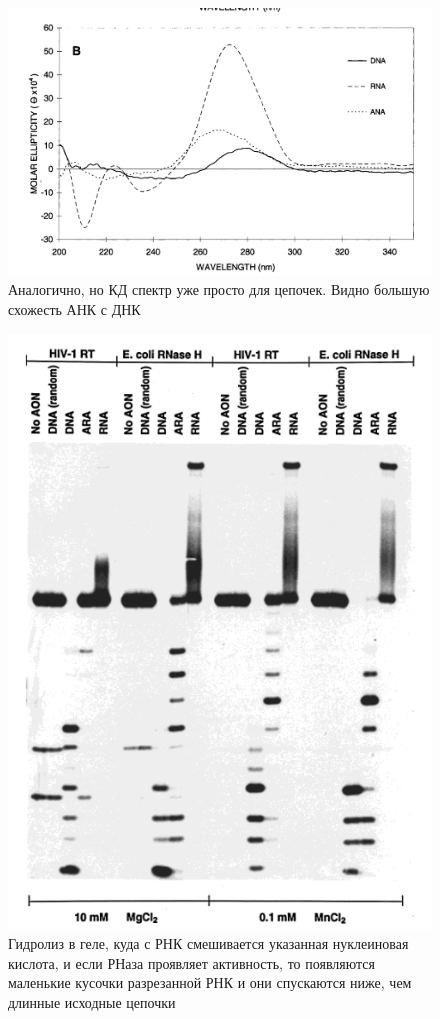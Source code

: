 	\begin{figure}[H]
		\centering
		\includegraphics[scale = 0.3]{Pictures/4_6}
		\caption{Аналогично, но КД спектр уже просто для цепочек.
			Видно большую схожесть АНК с ДНК}
	\end{figure}
	\begin{figure}[H]
		\centering
		\includegraphics[scale = 0.3]{Pictures/4_7}
		\caption{Гидролиз в геле, куда с РНК смешивается указанная нуклеиновая кислота, и если РНаза проявляет активность, то появляются маленькие кусочки разрезанной РНК и они спускаются ниже, чем длинные исходные цепочки}
	\end{figure}

